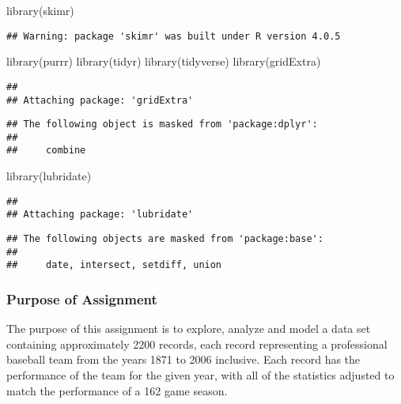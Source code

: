 \documentclass[
]{article}
\newenvironment{Shaded}{\begin{snugshade}}{\end{snugshade}}
\newcommand{\FunctionTok}[1]{\textcolor[rgb]{0.00,0.00,0.00}{#1}}
\newcommand{\NormalTok}[1]{#1}
\begin{document}
\begin{Shaded}
\begin{Highlighting}[]
\FunctionTok{library}\NormalTok{(skimr)}
\end{Highlighting}
\end{Shaded}

\begin{verbatim}
## Warning: package 'skimr' was built under R version 4.0.5
\end{verbatim}

\begin{Shaded}
\begin{Highlighting}[]
\FunctionTok{library}\NormalTok{(purrr)}
\FunctionTok{library}\NormalTok{(tidyr)}
\FunctionTok{library}\NormalTok{(tidyverse)}
\FunctionTok{library}\NormalTok{(gridExtra)}
\end{Highlighting}
\end{Shaded}

\begin{verbatim}
## 
## Attaching package: 'gridExtra'
\end{verbatim}

\begin{verbatim}
## The following object is masked from 'package:dplyr':
## 
##     combine
\end{verbatim}

\begin{Shaded}
\begin{Highlighting}[]
\FunctionTok{library}\NormalTok{(lubridate)}
\end{Highlighting}
\end{Shaded}

\begin{verbatim}
## 
## Attaching package: 'lubridate'
\end{verbatim}

\begin{verbatim}
## The following objects are masked from 'package:base':
## 
##     date, intersect, setdiff, union
\end{verbatim}

\hypertarget{purpose-of-assignment}{%
\subsubsection{Purpose of Assignment}\label{purpose-of-assignment}}

The purpose of this assignment is to explore, analyze and model a data
set containing approximately 2200 records, each record representing a
professional baseball team from the years 1871 to 2006 inclusive. Each
record has the performance of the team for the given year, with all of
the statistics adjusted to match the performance of a 162 game season.
\end{document}
